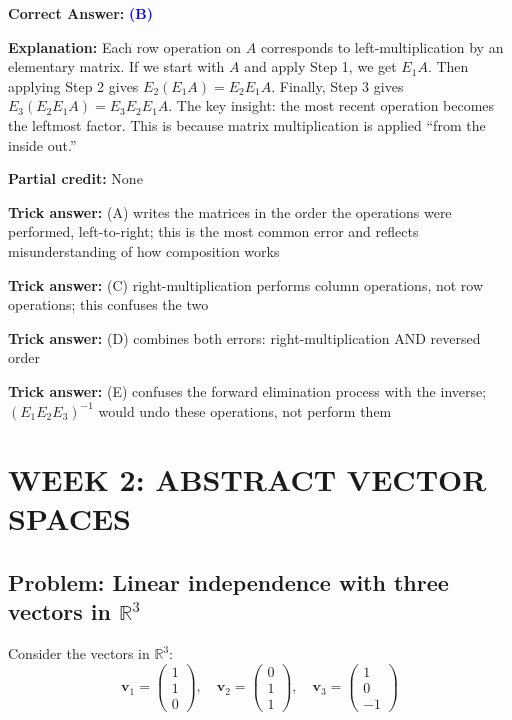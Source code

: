 \documentclass[12pt]{amsart}
\begin{document}
\textbf{Correct Answer:} \textcolor{blue}{\textbf{(B)}}

\textbf{Explanation:} Each row operation on $A$ corresponds to left-multiplication by an elementary matrix. If we start with $A$ and apply Step 1, we get $E_1 A$. Then applying Step 2 gives $E_2(E_1 A) = E_2 E_1 A$. Finally, Step 3 gives $E_3(E_2 E_1 A) = E_3 E_2 E_1 A$. The key insight: the most recent operation becomes the leftmost factor. This is because matrix multiplication is applied ``from the inside out.''

\textbf{Partial credit:} None

\textbf{Trick answer:} (A) writes the matrices in the order the operations were performed, left-to-right; this is the most common error and reflects misunderstanding of how composition works

\textbf{Trick answer:} (C) right-multiplication performs column operations, not row operations; this confuses the two

\textbf{Trick answer:} (D) combines both errors: right-multiplication AND reversed order

\textbf{Trick answer:} (E) confuses the forward elimination process with the inverse; $(E_1 E_2 E_3)^{-1}$ would undo these operations, not perform them

\newpage

\section*{WEEK 2: ABSTRACT VECTOR SPACES}

\subsection*{Problem: Linear independence with three vectors in $\mathbb{R}^3$}

Consider the vectors in $\mathbb{R}^3$:
$$\mathbf{v}_1 = \begin{pmatrix} 1 \\ 1 \\ 0 \end{pmatrix}, \quad \mathbf{v}_2 = \begin{pmatrix} 0 \\ 1 \\ 1 \end{pmatrix}, \quad \mathbf{v}_3 = \begin{pmatrix} 1 \\ 0 \\ -1 \end{pmatrix}$$
\end{document}
